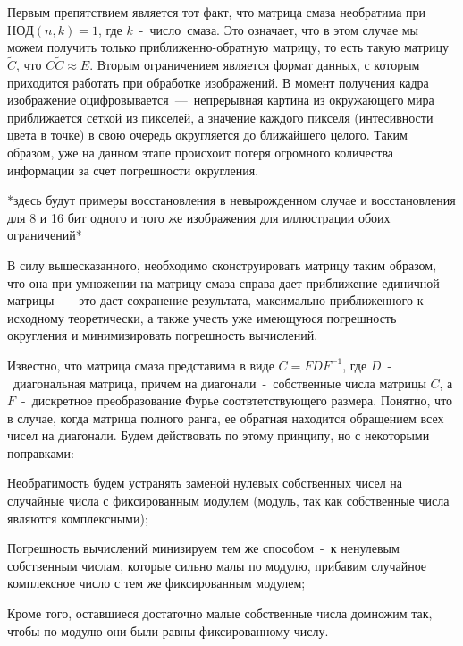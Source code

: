 \documentclass[a4paper]{article}
\theoremstyle{definition}
\newcounter{qcounter}
\begin{document}
    Первым препятствием является тот факт, что матрица смаза необратима при $НОД(n, k) = 1$, где $k$~-~число~смаза. Это означает, что в этом случае мы можем получить только приближенно-обратную матрицу, то есть такую матрицу $\tilde{C}$, что $C\tilde{C} \approx E$. Вторым ограничением является формат данных, с которым приходится работать при обработке изображений. В момент получения кадра изображение оцифровывается~---~непрерывная картина из окружающего мира приближается сеткой из пикселей, а значение каждого пикселя (интесивности цвета в точке) в свою очередь округляется до ближайшего целого. Таким образом, уже на данном этапе происхоит потеря огромного количества информации за счет погрешности округления.


    *здесь будут примеры восстановления в невырожденном случае и восстановления для 8 и 16 бит одного и того же изображения для иллюстрации обоих ограничений*


    В силу вышесказанного, необходимо сконструировать матрицу таким образом, что она при умножении на матрицу смаза справа дает приближение единичной матрицы~---~это даст сохранение результата, максимально приближенного к исходному теоретически, а также учесть уже имеющуюся погрешность округления и минимизировать погрешность вычислений.


    Известно, что матрица смаза представима в виде $C = FDF^{-1}$, где $D$~-~диагональная матрица, причем на диагонали~-~собственные числа матрицы $C$, а $F$~-~дискретное преобразование Фурье соотвтетствующего размера. Понятно, что в случае, когда матрица полного ранга, ее обратная находится обращением всех чисел на диагонали. Будем действовать по этому принципу, но с некоторыми поправками:


    \begin{list}{)~}{}
        \item Необратимость будем устранять заменой нулевых собственных чисел на случайные числа с фиксированным модулем (модуль, так как собственные числа являются комплексными);
        \item Погрешность вычислений минизируем тем же способом~-~к ненулевым собственным числам, которые сильно малы по модулю, прибавим случайное комплексное число с тем же фиксированным модулем;
        \item Кроме того, оставшиеся достаточно малые собственные числа домножим так, чтобы по модулю они были равны фиксированному числу.
    \end{list}


    
\end{document}
